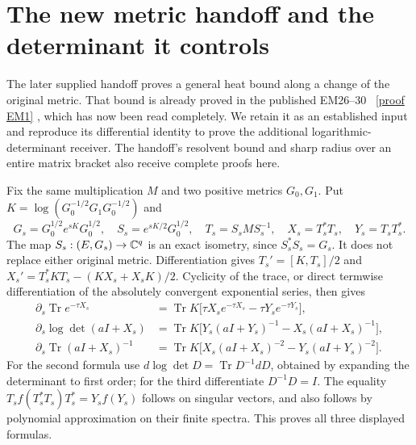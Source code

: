 \documentclass[11pt]{article}
\newcommand{\Tr}{\operatorname{Tr}}\newcommand{\rank}{\operatorname{rank}}
\begin{document}
\section{The new metric handoff and the determinant it controls}
The later supplied handoff \cite[Section 1]{metricintake} proves a
general heat bound along a change of the original metric. That bound is
already proved in the published EM26--30 \cite{EM}%
~\href{https://github.com/KokunoYumeto/zeta-function-research-reader/blob/5992ad50c0f2a06921f1fcaded7b4e38097c0739/workbenches/splitzero-tandem/continuations/20260920-original-kernel-mixed-determinants/providers/ENDPOINT_METRIC_HEAT.tex\#L38}{[proof EM1]}%
{}, which has now been
read completely. We retain it as an established input and reproduce its
differential identity to prove the additional logarithmic-determinant
receiver. The handoff's resolvent bound and sharp radius over an entire
matrix bracket also receive complete proofs here.

Fix the same multiplication $M$ and two positive metrics $G_0,G_1$.
Put $K=\log(G_0^{-1/2}G_1G_0^{-1/2})$ and
\[
G_s=G_0^{1/2}e^{sK}G_0^{1/2},\quad
S_s=e^{sK/2}G_0^{1/2},\quad T_s=S_sMS_s^{-1},\quad
X_s=T_s^*T_s,\quad Y_s=T_sT_s^*.
\]
The map $S_s:(E,G_s)\to\mathbb C^q$ is an exact isometry, since
$S_s^*S_s=G_s$. It does not replace either original metric.
Differentiation gives $T_s'=[K,T_s]/2$ and
$X_s'=T_s^*KT_s-(KX_s+X_sK)/2$. Cyclicity of the trace, or direct
termwise differentiation of the absolutely convergent exponential
series, then gives
\begin{equation}\tag{SD26}
\begin{aligned}
\partial_s\Tr e^{-\tau X_s}
&=\Tr K\bigl[\tau X_se^{-\tau X_s}-\tau Y_se^{-\tau Y_s}\bigr],\\
\partial_s\log\det(aI+X_s)
&=\Tr K\bigl[Y_s(aI+Y_s)^{-1}-X_s(aI+X_s)^{-1}\bigr],\\
\partial_s\Tr(aI+X_s)^{-1}
&=\Tr K\bigl[X_s(aI+X_s)^{-2}-Y_s(aI+Y_s)^{-2}\bigr].
\end{aligned}
\end{equation}
For the second formula use $d\log\det D=\Tr D^{-1}dD$, obtained by
expanding the determinant to first order; for the third differentiate
$D^{-1}D=I$. The equality
$T_s f(T_s^*T_s)T_s^*=Y_sf(Y_s)$ follows on singular vectors, and
also follows by polynomial approximation on their finite spectra.
This proves all three displayed formulas.
\end{document}
